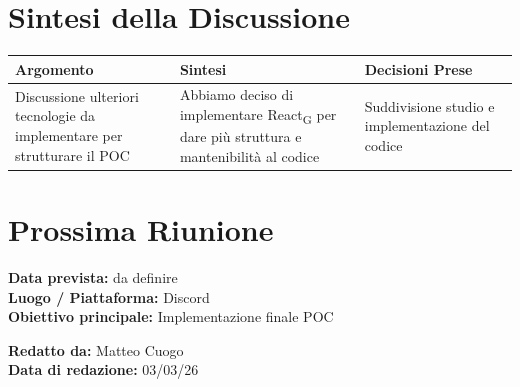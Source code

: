 \documentclass[a4paper,12pt]{article}
\newcommand{\gls}[1]{#1\textsubscript{G}}
\begin{document}
\section*{ Sintesi della Discussione}

\begin{longtable}{|p{}|p{}|p{}|}
\hline
\textbf{Argomento} & \textbf{Sintesi} & \textbf{Decisioni Prese} \\ \hline
Discussione ulteriori tecnologie da implementare per strutturare il POC & Abbiamo deciso di implementare \gls{React} per dare più struttura e mantenibilità al codice & Suddivisione studio e implementazione del codice \\ \hline
\end{longtable}

\section*{ Prossima Riunione}
\textbf{Data prevista:} da definire \\
\textbf{Luogo / Piattaforma:} Discord \\
\textbf{Obiettivo principale:} Implementazione finale POC

\textbf{Redatto da:} Matteo Cuogo \\
\textbf{Data di redazione:} 03/03/26
\end{document}

